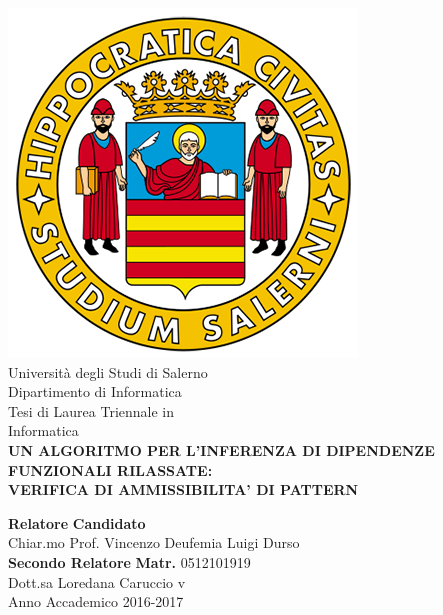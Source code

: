 \begin{center}
    \includegraphics[scale = 0.3]{Immagini/logoUnisa.png}\\
    \vspace{1cm}
    {\Large Università degli Studi di Salerno}\\[0.2truecm]
    {\large Dipartimento di Informatica}\\
    \hrulefill
    \vfill
    {\large Tesi di Laurea Triennale in }\\[0.2truecm]
    {\Large Informatica}\\
    \vfill
    {\large \bf UN ALGORITMO PER L'INFERENZA DI DIPENDENZE FUNZIONALI RILASSATE:}\\
    \vspace{0,5cm}
    {\large \bf VERIFICA DI AMMISSIBILITA' DI PATTERN}
    \vfill\vfill\vfill
    
    
    {\bf Relatore} \hfill {\bf Candidato} \\
    Chiar.mo Prof. Vincenzo Deufemia \hfill Luigi Durso \\
    {\bf Secondo Relatore}
    \hfill \textbf{Matr.} 0512101919\\
    
    
    Dott.sa Loredana Caruccio  \hfill {\phantom v} \\
    \vspace{1cm}
    \hrulefill 
    \vfill
    Anno Accademico 2016-2017
\end{center}